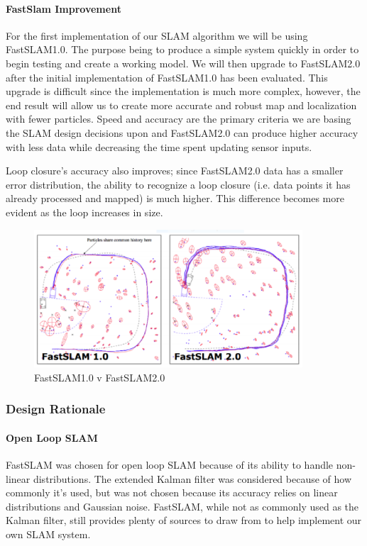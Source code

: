 \documentclass[10pt, onecolumn, draftclsnofoot, letterpaper,compsoc]{IEEEtran}
\begin{document}
\paragraph{FastSlam Improvement}
For the first implementation of our SLAM algorithm we will be using FastSLAM1.0. The purpose being to produce a simple system quickly in order to begin testing and create a working model. We will then upgrade to FastSLAM2.0 after the initial implementation of FastSLAM1.0 has been evaluated. This upgrade is difficult since the implementation is much more complex, however, the end result will allow us to create more accurate and robust map and localization with fewer particles. Speed and accuracy are the primary criteria we are basing the SLAM design decisions upon and FastSLAM2.0 can produce higher accuracy with less data while decreasing the time spent updating sensor inputs.  

Loop closure's accuracy also improves; since FastSLAM2.0 data has a smaller error distribution, the ability to recognize a loop closure (i.e. data points it has already processed and mapped) is much higher. This difference becomes more evident as the loop increases in size. 

\begin{figure}[H]
\centering
\label{fig:FastSLAM1.0vFastSLAM2.0}
\caption{FastSLAM1.0 v FastSLAM2.0}
\includegraphics[width=10cm]{images/FastSLAM_1vFastSLAM_2}
\end{figure}


\subsubsection{Design Rationale} %
\paragraph{Open Loop SLAM}
FastSLAM was chosen for open loop SLAM because of its ability to handle non-linear distributions. The extended Kalman filter was considered because of how commonly it's used, but was not chosen because its accuracy relies on linear distributions and Gaussian noise. FastSLAM, while not as commonly used as the Kalman filter, still provides plenty of sources to draw from to help implement our own SLAM system.
\end{document}
